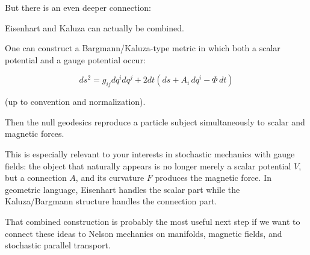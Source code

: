 But there is an even deeper connection:

Eisenhart and Kaluza can actually be combined.

One can construct a Bargmann/Kaluza-type metric in which both a scalar potential and a gauge potential occur:

$$ \boxed{ ds^2 = g_{ij}dq^i dq^j + 2dt\left(ds+A_i\,dq^i-\Phi\,dt\right) } $$

(up to convention and normalization).

Then the null geodesics reproduce a particle subject simultaneously to scalar and magnetic forces.

This is especially relevant to your interests in stochastic mechanics with gauge fields: the object that naturally appears is no longer merely a scalar potential \(V\), but a connection \(A\), and its curvature \(F\) produces the magnetic force. In geometric language, Eisenhart handles the scalar part while the Kaluza/Bargmann structure handles the connection part.

That combined construction is probably the most useful next step if we want to connect these ideas to Nelson mechanics on manifolds, magnetic fields, and stochastic parallel transport.
